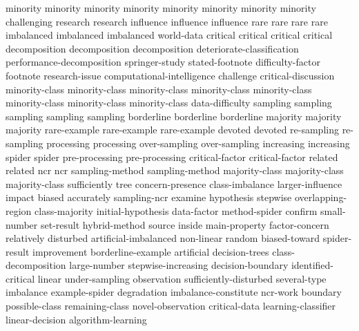 minority	minority	minority	minority	minority	minority	minority	minority	
challenging	
research	research	
influence	influence	influence	
rare	rare	rare	rare	
imbalanced	imbalanced	imbalanced	
world-data	
critical	critical	critical	critical	
decomposition	decomposition	decomposition	
deteriorate-classification	
performance-decomposition	
springer-study	
stated-footnote	
difficulty-factor	
footnote	
research-issue	
computational-intelligence	
challenge	
critical-discussion	
minority-class	minority-class	minority-class	minority-class	minority-class	minority-class	minority-class	minority-class	
data-difficulty	
sampling	sampling	sampling	sampling	sampling	
borderline	borderline	borderline	
majority	majority	majority	
rare-example	rare-example	rare-example	
devoted	devoted	
re-sampling	re-sampling	
processing	processing	
over-sampling	over-sampling	
increasing	increasing	
spider	spider	
pre-processing	pre-processing	
critical-factor	critical-factor	
related	related	
ncr	ncr	
sampling-method	sampling-method	
majority-class	majority-class	majority-class	
sufficiently	
tree	
concern-presence	
class-imbalance	
larger-influence	
impact	
biased	
accurately	
sampling-ncr	
examine	
hypothesis	
stepwise	
overlapping-region	
class-majority	
initial-hypothesis	
data-factor	
method-spider	
confirm	
small-number	
set-result	
hybrid-method	
source	
inside	
main-property	
factor-concern	
relatively	
disturbed	
artificial-imbalanced	
non-linear	
random	
biased-toward	
spider-result	
improvement	
borderline-example	
artificial	
decision-trees	
class-decomposition	
large-number	
stepwise-increasing	
decision-boundary	
identified-critical	
linear	
under-sampling	
observation	
sufficiently-disturbed	
several-type	
imbalance	
example-spider	
degradation	
imbalance-constitute	
ncr-work	
boundary	
possible-class	
remaining-class	
novel-observation	
critical-data	
learning-classifier	
linear-decision	
algorithm-learning	
